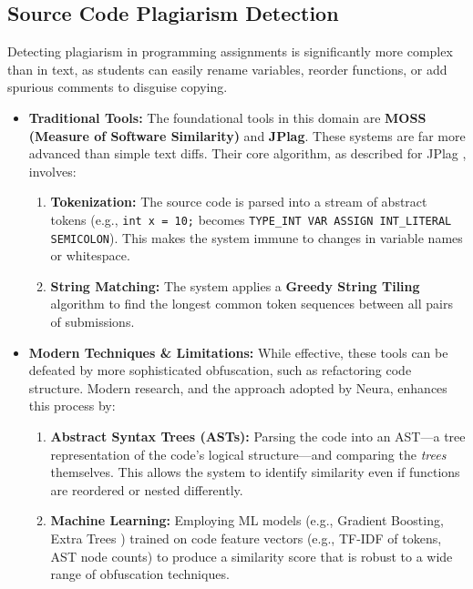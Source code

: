 \subsection{Source Code Plagiarism Detection}

Detecting plagiarism in programming assignments is significantly more complex than in text, as students can easily rename variables, reorder functions, or add spurious comments to disguise copying.

\begin{itemize}
    \item \textbf{Traditional Tools:} The foundational tools in this domain are \textbf{MOSS (Measure of Software Similarity)} \cite{aikenMOSS} and \textbf{JPlag}.\cite{jplag1, jplag2, jplag3} These systems are far more advanced than simple text diffs. Their core algorithm, as described for JPlag \cite{jplag3}, involves:
    \begin{enumerate}
        \item \textbf{Tokenization:} The source code is parsed into a stream of abstract tokens (e.g., \texttt{int x = 10;} becomes \texttt{TYPE\_INT VAR ASSIGN INT\_LITERAL SEMICOLON}). This makes the system immune to changes in variable names or whitespace.
        \item \textbf{String Matching:} The system applies a \textbf{Greedy String Tiling} algorithm \cite{jplag3} to find the longest common token sequences between all pairs of submissions.
    \end{enumerate}
    \item \textbf{Modern Techniques \& Limitations:} While effective, these tools can be defeated by more sophisticated obfuscation, such as refactoring code structure.\cite{plagiarism_obfuscation} Modern research, and the approach adopted by Neura, enhances this process by:
    \begin{enumerate}
        \item \textbf{Abstract Syntax Trees (ASTs):} Parsing the code into an AST—a tree representation of the code's logical structure—and comparing the \textit{trees} themselves.\cite{ast_plagiarism1, ast_plagiarism2} This allows the system to identify similarity even if functions are reordered or nested differently.
        \item \textbf{Machine Learning:} Employing ML models \cite{ml_plagiarism1} (e.g., Gradient Boosting, Extra Trees \cite{ml_plagiarism2}) trained on code feature vectors (e.g., TF-IDF of tokens, AST node counts) to produce a similarity score that is robust to a wide range of obfuscation techniques.\cite{ml_plagiarism3}
    \end{enumerate}
\end{itemize}

